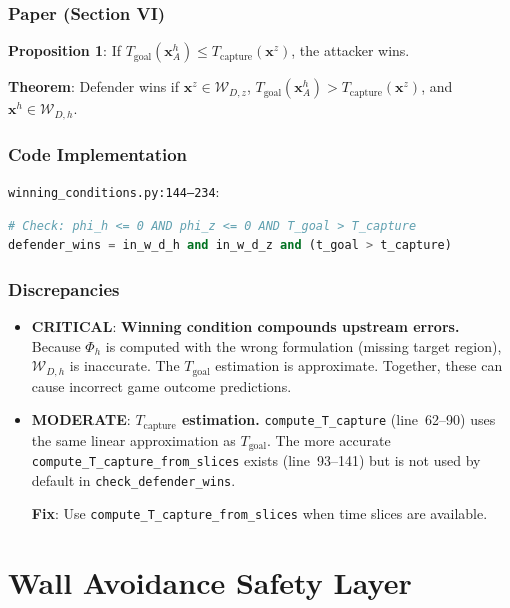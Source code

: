 \documentclass[11pt,a4paper]{article}
\begin{document}
\subsubsection{Paper (Section VI)}

\textbf{Proposition 1}: If $T_{\mathrm{goal}}(\mathbf{x}^h_A) \leq T_{\mathrm{capture}}(\mathbf{x}^z)$, the attacker wins.

\textbf{Theorem}: Defender wins if $\mathbf{x}^z \in \mathcal{W}_{D,z}$, $T_{\mathrm{goal}}(\mathbf{x}^h_A) > T_{\mathrm{capture}}(\mathbf{x}^z)$, and $\mathbf{x}^h \in \mathcal{W}_{D,h}$.

\subsubsection{Code Implementation}

\texttt{winning\_conditions.py:144--234}:
\begin{lstlisting}[language=Python]
# Check: phi_h <= 0 AND phi_z <= 0 AND T_goal > T_capture
defender_wins = in_w_d_h and in_w_d_z and (t_goal > t_capture)
\end{lstlisting}

\subsubsection{Discrepancies}

\begin{itemize}
\item \textcolor{critred}{\textbf{CRITICAL}}: \textbf{Winning condition compounds upstream errors.} Because $\Phi_h$ is computed with the wrong formulation (missing target region), $\mathcal{W}_{D,h}$ is inaccurate. The $T_{\mathrm{goal}}$ estimation is approximate. Together, these can cause incorrect game outcome predictions.

\item \textcolor{modoran}{\textbf{MODERATE}}: \textbf{$T_{\mathrm{capture}}$ estimation.} \texttt{compute\_T\_capture} (line~62--90) uses the same linear approximation as $T_{\mathrm{goal}}$. The more accurate \texttt{compute\_T\_capture\_from\_slices} exists (line~93--141) but is not used by default in \texttt{check\_defender\_wins}.

\textbf{Fix}: Use \texttt{compute\_T\_capture\_from\_slices} when time slices are available.
\end{itemize}

\section{Wall Avoidance Safety Layer}
\end{document}
